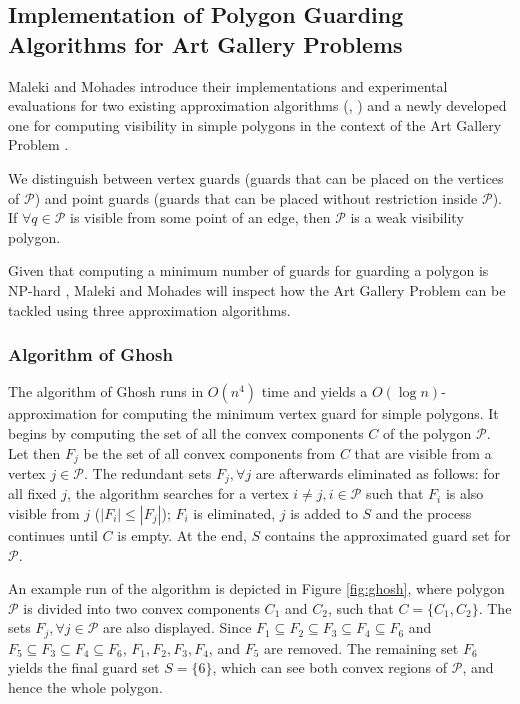 \subsection{Implementation of Polygon Guarding Algorithms for Art Gallery Problems \cite{maleki2022implementation}}
Maleki and Mohades \cite{maleki2022implementation} introduce their implementations and experimental evaluations for two existing approximation algorithms (\cite{GHOSH2010718}, \cite{bhattacharya2016approximability}) and a newly developed one for computing visibility in simple polygons in the context of the Art Gallery Problem \cite{o1987art}.

We distinguish between vertex guards (guards that can be placed on the vertices of $\mathcal P$) and point guards (guards that can be placed without restriction inside $\mathcal P$). If $\forall q \in \mathcal P$ is visible from some point of an edge, then $\mathcal P$ is a weak visibility polygon.

Given that computing a minimum number of guards for guarding a polygon is NP-hard \cite{1057165}, Maleki and Mohades will inspect how the Art Gallery Problem \cite{o1987art} can be tackled using three approximation algorithms.

\subsubsection{Algorithm of Ghosh \cite{GHOSH2010718}}
The algorithm of Ghosh \cite{GHOSH2010718} runs in $O(n^4)$ time and yields a $O(\log n)$-approximation for computing the minimum vertex guard for simple polygons. It begins by  computing the set of all the convex components $C$ of the polygon $\mathcal P$. Let then $F_j$ be the set of all convex components from $C$ that are visible from a vertex $j \in \mathcal P$. The redundant sets $F_j, \forall j$ are afterwards eliminated as follows: for all fixed $j$, the algorithm searches for a vertex $i \neq j, i \in \mathcal P$ such that $F_i$ is also visible from $j$ ($|F_i| \leq |F_j|$); $F_i$ is eliminated, $j$ is added to $S$ and the process continues until $C$ is empty. At the end, $S$ contains the approximated guard set for $\mathcal P$.

An example run of the algorithm is depicted in Figure \ref{fig:ghosh}, where polygon $\mathcal P$ is divided into two convex components $C_1$ and $C_2$, such that $C = \{C_1, C_2\}$. The sets $F_j, \forall j \in \mathcal P$ are also displayed. Since $F_1 \subseteq F_2 \subseteq F_3 \subseteq F_4 \subseteq F_6$ and $F_5 \subseteq F_3 \subseteq F_4 \subseteq F_6$, $F_1, F_2, F_3, F_4$, and $F_5$ are removed. The remaining set $F_6$ yields the final guard set $S = \{6\}$, which can see both convex regions of $\mathcal P$, and hence the whole polygon.

